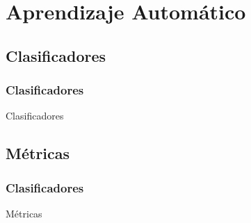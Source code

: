 \section{Aprendizaje Automático}

\subsection{Clasificadores}
\begin{frame}
    \frametitle{Clasificadores}
    Clasificadores
\end{frame}

\subsection{Métricas}
\begin{frame}
    \frametitle{Clasificadores}
    Métricas
\end{frame}
